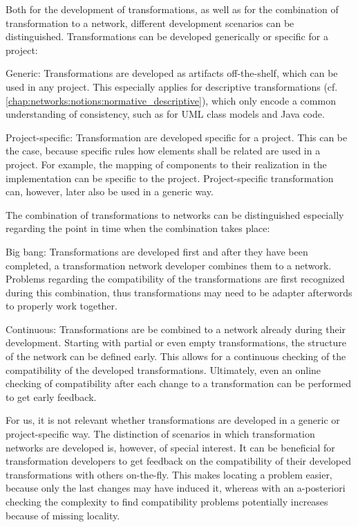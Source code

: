 Both for the development of transformations, as well as for the combination of transformation to a network, different development scenarios can be distinguished.
Transformations can be developed generically or specific for a project:
\begin{properdescription}
    \item[Generic:] Transformations are developed as artifacts off-the-shelf, which can be used in any project. This especially applies for descriptive transformations (cf. \autoref{chap:networks:notions:normative_descriptive}), which only encode a common understanding of consistency, such as for \gls{UML} class models and Java code.
    \item[Project-specific:] Transformation are developed specific for a project. This can be the case, because specific rules how elements shall be related are used in a project. For example, the mapping of components to their realization in the implementation can be specific to the project. Project-specific transformation can, however, later also be used in a generic way.
\end{properdescription}

The combination of transformations to networks can be distinguished especially regarding the point in time when the combination takes place:
\begin{properdescription}
    \item[Big bang:] Transformations are developed first and after they have been completed, a transformation network developer combines them to a network. Problems regarding the compatibility of the transformations are first recognized during this combination, thus transformations may need to be adapter afterwords to properly work together.
    \item[Continuous:] Transformations are be combined to a network already during their development. Starting with partial or even empty transformations, the structure of the network can be defined early. This allows for a continuous checking of the compatibility of the developed transformations. Ultimately, even an online checking of compatibility after each change to a transformation can be performed to get early feedback.
\end{properdescription}

For us, it is not relevant whether transformations are developed in a generic or project-specific way.
The distinction of scenarios in which transformation networks are developed is, however, of special interest.
It can be beneficial for transformation developers to get feedback on the compatibility of their developed transformations with others on-the-fly.
This makes locating a problem easier, because only the last changes may have induced it, whereas with an a-posteriori checking the complexity to find compatibility problems potentially increases because of missing locality.

